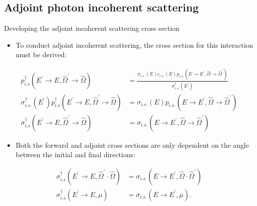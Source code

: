 \documentclass{beamer}
\begin{document}
\subsection{Adjoint photon incoherent scattering}
\begin{frame}{Developing the adjoint incoherent scattering cross section}
  
  \begin{itemize}
    \item To conduct adjoint incoherent scattering, the cross section for 
      this interaction must be derived:
  \end{itemize}
  \begin{align}
    p_{i.s}^{\dagger}(E^{'} \to E, \hat{\Omega}^{'} \to \hat{\Omega}) & =
    \frac{\sigma_{i.s.}(E)c_{i.s.}(E)
      p_{i.s.}(E \to E^{'},\hat{\Omega} \to \hat{\Omega}^{'})}
         {\sigma_{i.s.}^{\dagger}(E^{'})} \nonumber \\
         \sigma_{i.s.}^{\dagger}(E^{'})
         p_{i.s}^{\dagger}(E^{'} \to E, \hat{\Omega}^{'} \to \hat{\Omega}) & = 
         \sigma_{i.s.}(E)p_{i.s.}(E \to E^{'},\hat{\Omega} \to \hat{\Omega}^{'})
         \nonumber \\
         \sigma_{i.s}^{\dagger}(E^{'} \to E, \hat{\Omega}^{'} \to \hat{\Omega}) & = 
         \sigma_{i.s.}(E \to E^{'},\hat{\Omega} \to \hat{\Omega}^{'}) \nonumber
  \end{align}

  \begin{itemize}
    \item Both the forward and adjoint cross sections are only dependent on the 
      angle between the initial and final directions:
  \end{itemize}
  
  \begin{align}
    \sigma_{i.s}^{\dagger}(E^{'} \to E, \hat{\Omega}^{'} \cdot \hat{\Omega}) & = 
    \sigma_{i.s.}(E \to E^{'},\hat{\Omega} \cdot \hat{\Omega}^{'}) \nonumber \\
    \sigma_{i.s}^{\dagger}(E^{'} \to E, \mu) & = 
    \sigma_{i.s.}(E \to E^{'}, \mu). \nonumber
  \end{align}

\end{frame}
\end{document}
